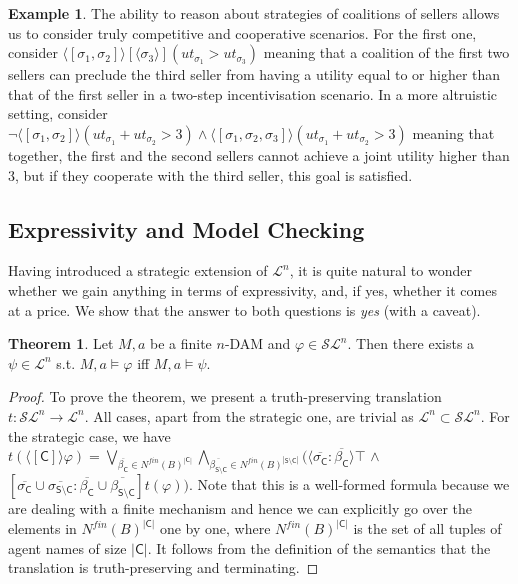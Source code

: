 \documentclass[letterpaper]{article} %
\theoremstyle{definition}
\newtheorem{theorem}{Theorem}
\newtheorem{example}{Example}
\newcommand{\Nfin}{N^{\mathit{fin}}}
\begin{document}
\begin{example}
    The ability to reason about strategies of coalitions of sellers allows us to consider truly competitive and cooperative scenarios. For the first one, consider $\langle \! [\sigma_1,\sigma_2] \! \rangle [ \! \langle\sigma_3\rangle \! ] (ut_{\sigma_1} > ut_{\sigma_3})$ meaning that a coalition of the first two sellers %
    can preclude the third seller from having a utility equal to or higher than that of the first seller in a two-step incentivisation scenario. In a more altruistic setting, consider $\lnot \langle \! [\sigma_1,\sigma_2] \! \rangle (ut_{\sigma_1} + ut_{\sigma_2}>3) \land   \langle \! [\sigma_1,\sigma_2,\sigma_3] \! \rangle (ut_{\sigma_1} + ut_{\sigma_2}>3)$ meaning that together, the first and the second sellers cannot achieve a joint utility higher than 3, but if they cooperate with the third seller, this goal is satisfied.
\end{example}

\subsection{Expressivity and Model Checking}

Having introduced a strategic extension of $\mathcal{L}^n$, it is quite natural to wonder whether we gain anything in terms of expressivity, and, if yes, whether it comes at a price. We show that the answer to both questions is \textit{yes} (with a caveat). 

\begin{theorem}
\label{thm:truthpreserve}
Let $M,a$ be a finite $n$-DAM and $\varphi \in \mathcal{SL}^n$. Then there exists a $\psi \in \mathcal{L}^n$ s.t. $M,a \models \varphi$ iff $M,a \models \psi$.
\end{theorem}

\begin{proof}
    To prove the theorem, we present a truth-preserving translation $t:\mathcal{SL}^n \to \mathcal{L}^n$. All cases, apart from the strategic one, are trivial as $\mathcal{L}^n \subset \mathcal{SL}^n$. For the strategic case, we have $t(\langle \! [\mathsf{C}] \! \rangle \varphi) = \bigvee_{\overline{\beta_\mathsf{C}} \in \Nfin(B)^{|\mathsf{C}|}} \bigwedge_{\overline{\beta_{\mathsf{S \setminus C}}} \in \Nfin(B)^{|\mathsf{S \setminus C}|}} (\langle \overline{\sigma_{\mathsf{C}}}: \overline{\beta_{\mathsf{C}}} \rangle \top$ $\land$ 
$[{\overline{\sigma_\mathsf{C}}\cup \overline{\sigma_{\mathsf{S \setminus C}}}:\overline{\beta_\mathsf{C}}\cup \overline{\beta_{\mathsf{S \setminus C}}}} ] t(\varphi))$. Note that this is a well-formed formula because we are dealing with a finite mechanism and hence we can explicitly go over the elements in $\Nfin(B)^{|\mathsf{C}|}$ one by one, where $\Nfin(B)^{|\mathsf{C}|}$ is the set of all tuples of agent names of size $|\mathsf{C}|$. It follows from the definition of the semantics that the translation is truth-preserving and terminating.
\end{proof}
\end{document}
